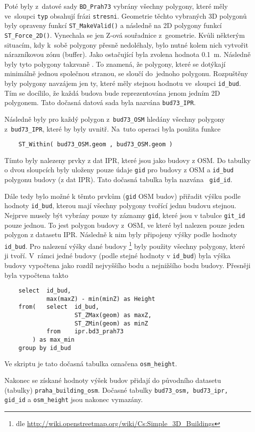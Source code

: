 Poté byly z~datové sady {\tt BD\_Prah73} vybrány všechny polygony,
které měly ve~sloupci {\tt typ} obsahují frázi {\tt stresni}.
Geometrie těchto vybraných 3D polygonů byly opraveny funkcí
{\tt ST\_MakeValid()} a následně  na 2D polygony funkcí
{\tt ST\_Force\_2D()}. Vynechala se jen Z-ová souřadnice z~geometrie.
Kvůli některým situacím, kdy k~sobě polygony přesně nedoléhaly, bylo
nutné kolem nich vytvořit nárazníkovou zónu (buffer). Jako ostačující
byla zvolena hodnota 0.1~m. Následně byly tyto polygony takzvaně
. To znamená, že polygony, které se dotýkají
minimálně jednou společnou stranou, se sloučí do~jednoho polygonu.
Rozpuštěny byly polygony navzájem jen ty, které měly stejnou hodnotu
ve~sloupci {\tt id\_bud}. Tím se docílilo, že každá budova bude
reprezentována jenom jedním 2D polygonem. Tato dočasná datová sada
byla nazvána {\tt bud73\_IPR}.

Následně byly pro každý polygon z~{\tt bud73\_OSM} hledány
všechny polygony z~{\tt bud73\_IPR}, které by byly uvnitř.
Na~tuto operaci byla použita funkce
\begin{verbatim}
    ST_Within( bud73_OSM.geom , bud73_OSM.geom )
\end{verbatim}
Tímto byly nalezeny prvky z dat IPR, které jsou  jako budovy z OSM. Do tabulky o dvou sloupcích byly
uloženy pouze údaje {\tt gid} pro budovy z OSM a {\tt id\_bud}
polygonu budovy (z dat IPR). Tato dočasná tabulka byla nazvána {\tt
  gid\_id}.

Dále tedy bylo možné k těmto prvkům ({\tt gid} OSM budov) přiřadit
výšku podle hodnoty {\tt id\_bud}, kterou mají všechny polygony
tvořící jednu budovu stejnou. Nejprve musely být vybrány pouze ty
záznamy {\tt gid}, které jsou v tabulce {\tt git\_id} pouze jednou.
To jest polygon budovy z~OSM, ve které byl nalezen pouze jeden polygon
z datasetu IPR. Následně k nim byly připojeny výšky podle hodnoty
{\tt id\_bud}. Pro nalezení výšky dané budovy \footnote{dle \url{http://wiki.openstreetmap.org/wiki/Cs:Simple_3D_Buildings}}
byly použity všechny polygony, které ji tvoří. V~rámci jedné budovy
(podle stejné hodnoty v {\tt id\_bud}) byla výška budovy vypočtena
jako rozdíl nejvyššího bodu a nejnižšího bodu budovy.
Přesněji byla vypočtena takto
\begin{verbatim}
    select	id_bud,
            max(maxZ) - min(minZ) as Height
    from(   select	id_bud,
                    ST_ZMax(geom) as maxZ,
                    ST_ZMin(geom) as minZ
            from    ipr.bd3_prah73
        ) as max_min
    group by id_bud
\end{verbatim}
Ve skriptu je tato dočasná tabulka označena {\tt osm\_height}.

Nakonec se získané hodnoty výšek budov přidají do původního datasetu
(tabulky) {\tt praha\_building\_osm}. 
Dočasné tabulky {\tt bud73\_osm, bud73\_ipr, gid\_id} a
{\tt osm\_height} jsou nakonec vymazány.

